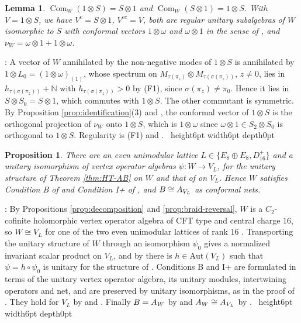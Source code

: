 \documentclass[leqno]{article}
\newcommand{\N}{\ensuremath{\mathbb{N}}}
\newcommand{\Aut}{\mathrm{Aut}}
\let\cal\relax
\newcommand{\cal}{\mathcal}
\newcommand{\qed}{\hfill \vrule height6pt  width6pt depth0pt}
\newcommand{\co}{\colon}
\newcommand{\ot}{\otimes}
\newtheorem{prop}[thm]{Proposition}
\newtheorem{lemma}[thm]{Lemma}
\newenvironment{proof}[1][]{\noindent {\it Proof #1} : }{\hbox{~}\qed
\smallskip
}
\numberwithin{equation}{section}
\begin{document}
\begin{lemma}
\label{lem:commutants}
$\operatorname{Com}_W(1 \ot S) = S \ot 1$ and $\operatorname{Com}_W(S \ot 1) = 1 \ot S$. With $V = 1 \ot S$, we have $V^c = S \ot 1$, $V^{cc} = V$, both are regular unitary subalgebras of $W$ isomorphic to $S$ with conformal vectors $1 \ot \omega$ and $\omega \ot 1$ in the sense of \cite[Proposition 5.29 p.~45]{CKLW18}, and $\nu_W = \omega \ot 1+1 \ot \omega$.
\end{lemma}

\begin{proof}
A vector of $W$ annihilated by the non-negative modes of $1 \ot S$ is annihilated by $1 \ot L_0 = (1 \ot \omega)_{(1)}$, whose spectrum on $M_{\tau(\pi_z)} \ot M_{\tau(\sigma(\pi_z))}$, $z \neq 0$, lies in $h_{\tau(\sigma(\pi_z))}+\N$ with $h_{\tau(\sigma(\pi_z))} > 0$ by (F1), since $\sigma(\pi_z) \neq \pi_0$. Hence it lies in $S \ot S_0 = S \ot 1$, which commutes with $1 \ot S$. The other commutant is symmetric. By Proposition \ref{prop:identification}(3) and \cite[Proposition 5.29]{CKLW18}, the conformal vector of $1 \ot S$ is the orthogonal projection of $\nu_W$ onto $1 \ot S$, which is $1 \ot \omega$ since $\omega \ot 1 \in S_2 \ot S_0$ is orthogonal to $1 \ot S$. Regularity is (F1) and \cite[Theorem 4.5 p.~9]{ABD04}.
\end{proof}

\begin{prop}
\label{prop:lattice-identification}
There are an even unimodular lattice $L \in \{E_8 \oplus E_8, D_{16}^+\}$ and a unitary isomorphism of vertex operator algebras $\psi \co W \to V_L$, for the unitary structure of Theorem \ref{thm:HT-AB} on $W$ and that of \cite[Theorem 4.12]{DoL14} on $V_L$. Hence $W$ satisfies Condition B of \cite[Section 3.4 p.~44]{Gui26} and Condition I+ of \cite[Definition 6.17 p.~70]{Gui25}, and $\cal B \cong \cal A_{V_L}$ as conformal nets.
\end{prop}

\begin{proof}
By Propositions \ref{prop:decomposition} and \ref{prop:braid-reversal}, $W$ is a $C_2$-cofinite holomorphic vertex operator algebra of CFT type and central charge $16$, so $W \cong V_L$ for one of the two even unimodular lattices of rank $16$ \cite[Theorem 2 p.~2]{DoM04b}. Transporting the unitary structure of $W$ through an isomorphism $\psi_0$ gives a normalized invariant scalar product on $V_L$, and by \cite[Proposition 5.19 p.~40]{CKLW18} there is $h \in \Aut(V_L)$ such that $\psi = h \circ \psi_0$ is unitary for the structure of \cite[Theorem 4.12]{DoL14}. Conditions B and I+ are formulated in terms of the unitary vertex operator algebra, its unitary modules, intertwining operators and net, and are preserved by unitary isomorphisms, as in the proof of \cite[Theorem 7.17]{ArhII}. They hold for $V_L$ by \cite[Theorem 3.46 p.~57]{Gui26} and \cite[Example 6.19(b) p.~71]{Gui25}. Finally $\cal B = \cal A_W$ by \cite[Theorem 8.9(i) p.~66]{HeT25} and $\cal A_W \cong \cal A_{V_L}$ by \cite[Theorem 6.8 p.~53]{CKLW18}.
\end{proof}
\end{document}
